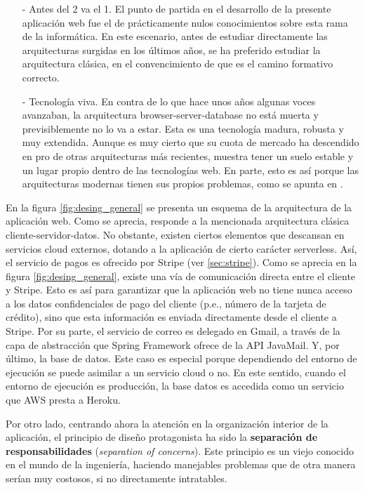 \documentclass[a4paper,12pt,twoside,openright]{report}
\begin{document}
    \begin{itemize}
    	\item[-] Antes del 2 va el 1. El punto de partida en el desarrollo de la presente aplicación web fue el de prácticamente nulos conocimientos sobre esta rama de la informática. En este escenario, antes de estudiar directamente las arquitecturas surgidas en los últimos años, se ha preferido estudiar la arquitectura clásica, en el convencimiento de que es el camino formativo correcto.
    	\item[-] Tecnología viva. En contra de lo que hace unos años algunas voces avanzaban, la arquitectura browser-server-database no está muerta y previsiblemente no lo va a estar. Esta es una tecnología madura, robusta y muy extendida. Aunque es muy cierto que su cuota de mercado ha descendido en pro de otras arquitecturas más recientes, muestra tener un suelo estable y un lugar propio dentro de las tecnologías web. En parte, esto es así porque las arquitecturas modernas tienen sus propios problemas, como se apunta en \cite{MacWright2020}.
    \end{itemize}
    
    En la figura \ref{fig:desing_general} se presenta un esquema de la arquitectura de la aplicación web. Como se aprecia, responde a la mencionada arquitectura clásica cliente-servidor-datos. No obstante, existen ciertos elementos que descansan en servicios cloud externos, dotando a la aplicación de cierto carácter serverless. Así, el servicio de pagos es ofrecido por Stripe (ver \ref{sec:stripe}). Como se aprecia en la figura \ref{fig:desing_general}, existe una vía de comunicación directa entre el cliente y Stripe. Esto es así para garantizar que la aplicación web no tiene nunca acceso a los datos confidenciales de pago del cliente (p.e., número de la tarjeta de crédito), sino que esta información es enviada directamente desde el cliente a Stripe. Por su parte, el servicio de correo es delegado en Gmail, a través de la capa de abstracción que Spring Framework ofrece de la API JavaMail. Y, por último, la base de datos. Este caso es especial porque dependiendo del entorno de ejecución se puede asimilar a un servicio cloud o no. En este sentido, cuando el entorno de ejecución es producción, la base datos es accedida como un servicio que AWS presta a Heroku.
        
    Por otro lado, centrando ahora la atención en la organización interior de la aplicación, el principio de diseño protagonista ha sido la \textbf{separación de responsabilidades} (\emph{separation of concerns}). Este principio es un viejo conocido en el mundo de la ingeniería, haciendo manejables problemas que de otra manera serían muy costosos, si no directamente intratables.
    
\end{document}
